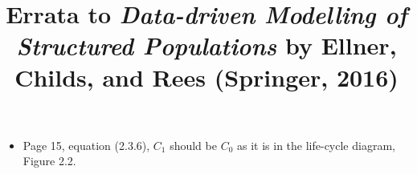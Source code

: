 \documentclass[11pt]{article}
\title{Errata to \emph{Data-driven Modelling of Structured Populations} by Ellner, Childs, and Rees (Springer, 2016)}
\numberwithin{equation}{section}
\begin{document}
\maketitle  

\begin{itemize}

\item[] Page 15, equation (2.3.6), $C_1$ should be $C_0$ as it is in the life-cycle diagram, Figure 2.2. 


\end{itemize}
\end{document}
